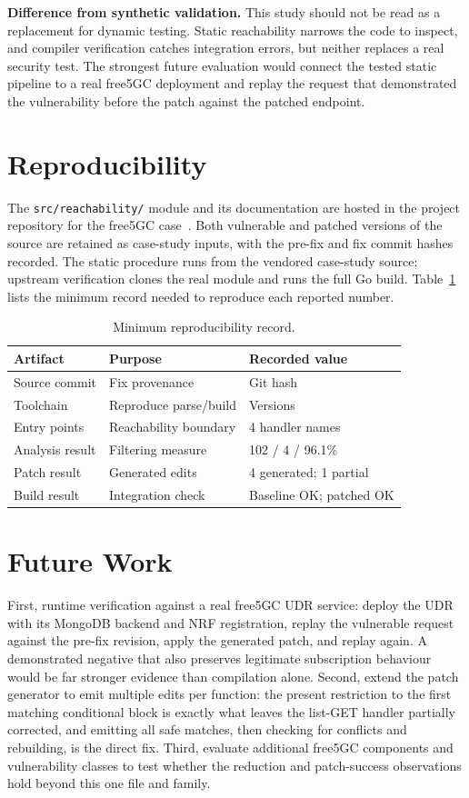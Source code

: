 \documentclass[sigconf]{acmart}
\begin{document}
\textbf{Difference from synthetic validation.} This study should not be read as a
replacement for dynamic testing. Static reachability narrows the code to inspect,
and compiler verification catches integration errors, but neither replaces a real
security test. The strongest future evaluation would connect the tested static
pipeline to a real free5GC deployment and replay the request that demonstrated
the vulnerability before the patch against the patched endpoint.

\section{Reproducibility}

The \texttt{src/reachability/} module and its documentation are hosted in the
project repository for the free5GC case~\cite{fyprepo}. Both vulnerable and
patched versions of the source are retained as case-study inputs, with the
pre-fix and fix commit hashes recorded. The static procedure runs from the
vendored case-study source; upstream verification clones the real module and runs
the full Go build. Table~\ref{tab:repro} lists the minimum record needed to
reproduce each reported number.

\begin{table}[t]
\centering
\caption{Minimum reproducibility record.}
\label{tab:repro}
\small
\begin{tabular}{@{}lll@{}}
\toprule
Artifact & Purpose & Recorded value \\
\midrule
Source commit & Fix provenance & Git hash \\
Toolchain & Reproduce parse/build & Versions \\
Entry points & Reachability boundary & 4 handler names \\
Analysis result & Filtering measure & 102 / 4 / 96.1\% \\
Patch result & Generated edits & 4 generated; 1 partial \\
Build result & Integration check & Baseline OK; patched OK \\
\bottomrule
\end{tabular}
\end{table}

\section{Future Work}

First, runtime verification against a real free5GC UDR service: deploy the UDR
with its MongoDB backend and NRF registration, replay the vulnerable request
against the pre-fix revision, apply the generated patch, and replay again. A
demonstrated negative that also preserves legitimate subscription behaviour would
be far stronger evidence than compilation alone. Second, extend the patch
generator to emit multiple edits per function: the present restriction to the
first matching conditional block is exactly what leaves the list-GET handler
partially corrected, and emitting all safe matches, then checking for conflicts
and rebuilding, is the direct fix. Third, evaluate additional free5GC components
and vulnerability classes to test whether the reduction and patch-success
observations hold beyond this one file and family.
\end{document}
